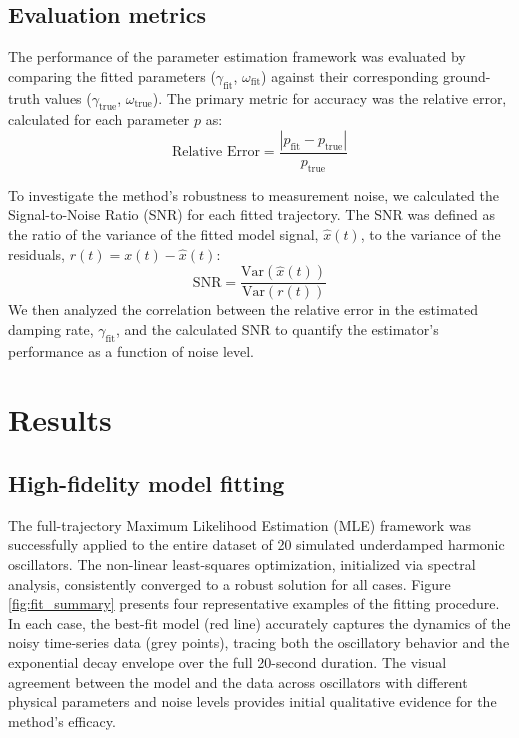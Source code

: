 \documentclass[]{article}
\begin{document}
\subsection{Evaluation metrics}
The performance of the parameter estimation framework was evaluated by comparing the fitted parameters ($\gamma_{\text{fit}}$, $\omega_{\text{fit}}$) against their corresponding ground-truth values ($\gamma_{\text{true}}$, $\omega_{\text{true}}$). The primary metric for accuracy was the relative error, calculated for each parameter $p$ as:
\begin{equation}
\text{Relative Error} = \frac{|p_{\text{fit}} - p_{\text{true}}|}{p_{\text{true}}}
\end{equation}

To investigate the method's robustness to measurement noise, we calculated the Signal-to-Noise Ratio (SNR) for each fitted trajectory. The SNR was defined as the ratio of the variance of the fitted model signal, $\hat{x}(t)$, to the variance of the residuals, $r(t) = x(t) - \hat{x}(t)$:
\begin{equation}
\text{SNR} = \frac{\text{Var}(\hat{x}(t))}{\text{Var}(r(t))}
\end{equation}
We then analyzed the correlation between the relative error in the estimated damping rate, $\gamma_{\text{fit}}$, and the calculated SNR to quantify the estimator's performance as a function of noise level.

\section{Results}
\label{sec:results}
\subsection{High-fidelity model fitting}

The full-trajectory Maximum Likelihood Estimation (MLE) framework was successfully applied to the entire dataset of 20 simulated underdamped harmonic oscillators. The non-linear least-squares optimization, initialized via spectral analysis, consistently converged to a robust solution for all cases. Figure \ref{fig:fit_summary} presents four representative examples of the fitting procedure. In each case, the best-fit model (red line) accurately captures the dynamics of the noisy time-series data (grey points), tracing both the oscillatory behavior and the exponential decay envelope over the full 20-second duration. The visual agreement between the model and the data across oscillators with different physical parameters and noise levels provides initial qualitative evidence for the method's efficacy.
\end{document}
